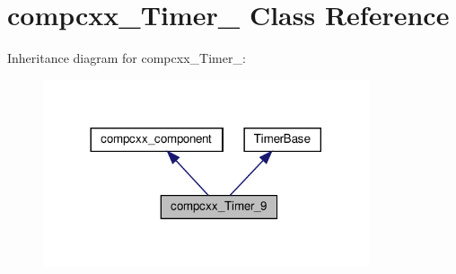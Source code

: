 \hypertarget{classcompcxx__Timer__9}{}\section{compcxx\+\_\+\+Timer\+\_ Class Reference}
\label{classcompcxx__Timer__9}


Inheritance diagram for compcxx\+\_\+\+Timer\+\_\+:\nopagebreak
\begin{figure}[H]
\begin{center}
\leavevmode
\includegraphics[width=272pt]{classcompcxx__Timer__9__inherit__graph}
\end{center}
\end{figure}


